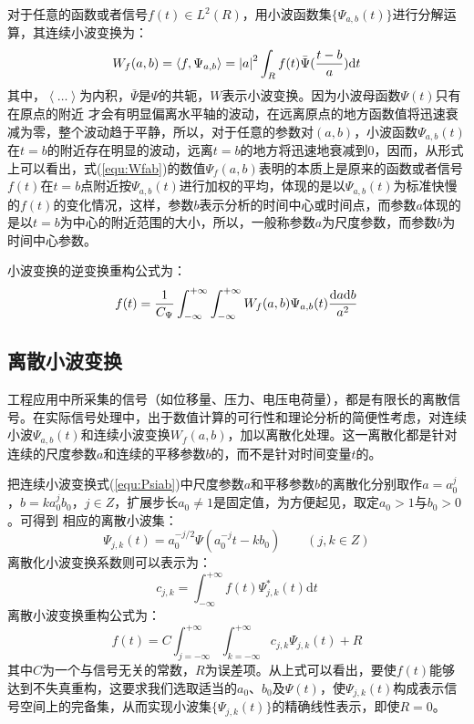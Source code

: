 对于任意的函数或者信号$f(t)\in L^2(R)$，用小波函数集$\{\Psi_{a,b}(t)\}$进行分解运算，其连续小波变换为：
\begin{equation}
\label{equ:Wfab}
	W_f(a,b) = \langle f, \Psi_{a,b} \rangle = {|a|}^2 \int_R f(t)  \bar{\Psi}({t-b \over a}) \mathrm{d}t
\end{equation}
其中，$\left\langle \dots\right\rangle$为内积，${\bar{\Psi}}$是$\Psi$的共轭，$W$表示小波变换。因为小波母函数$\Psi(t)$只有在原点的附近
才会有明显偏离水平轴的波动，在远离原点的地方函数值将迅速衰减为零，整个波动趋于平静，所以，对于任意的参数对$(a,b)$，小波函数$\Psi_{a,b}(t)$在$t=b$的附近存在明显的波动，远离$t=b$的地方将迅速地衰减到0，因而，从形式上可以看出，式(\ref{equ:Wfab})的数值$\Psi_f(a,b)$表明的本质上是原来的函数或者信号$f(t)$在$t=b$点附近按$\Psi_{a,b}(t)$进行加权的平均，体现的是以$\Psi_{a,b}(t)$为标准快慢的$f(t)$的变化情况，这样，参数$b$表示分析的时间中心或时间点，而参数$a$体现的是以$t=b$为中心的附近范围的大小，所以，一般称参数$a$为尺度参数，而参数$b$为时间中心参数。

小波变换的逆变换重构公式为：
\begin{equation}
	f(t) = {1\over C_\Psi} \int_{-\infty}^{+\infty} \int_{-\infty}^{+\infty} W_f (a,b) \Psi_{a,b}(t){\mathrm{d}a\mathrm{d}b \over a^2}
\end{equation}

\subsection{离散小波变换}
工程应用中所采集的信号（如位移量、压力、电压电荷量），都是有限长的离散信号。在实际信号处理中，出于数值计算的可行性和理论分析的简便性考虑，对连续小波$\Psi_{a,b}(t)$和连续小波变换$W_f(a,b)$，加以离散化处理。这一离散化都是针对连续的尺度参数$a$和连续的平移参数$b$的，而不是针对时间变量$t$的。

把连续小波变换式(\ref{equ:Psiab})中尺度参数$a$和平移参数$b$的离散化分别取作$a = a_0^j$，$b=ka_0^jb_0$，$j \in Z$，扩展步长$a_0 \neq 1$是固定值，为方便起见，取定$a_0>1$与$b_0>0$。可得到
相应的离散小波集：
\begin{equation}
	\Psi_{j,k}(t) = a_0^{-j/2} \Psi(a_0^{-j}t-kb_0)
	\qquad
	(j,k \in Z)
\end{equation}
离散化小波变换系数则可以表示为：
\begin{equation}
	c_{j,k} = \int_{-\infty}^{+\infty} f(t) \Psi_{j,k}^*(t) \mathrm{d}t
\end{equation}
离散小波变换重构公式为：
\begin{equation}
	f(t) = C \int_{j=-\infty}^{+\infty} \int_{k=-\infty}^{+\infty}
	c_{j,k} \Psi_{j,k}(t) +R
\end{equation}
其中$C$为一个与信号无关的常数，$R$为误差项。从上式可以看出，要使$f(t)$能够达到不失真重构，这要求我们选取适当的$a_0$、$b_0$及$\Psi(t)$，使$\Psi_{j,k}(t)$构成表示信号空间上的完备集，从而实现小波集$\{\Psi_{j,k}(t)\}$的精确线性表示，即使$R=0$。

